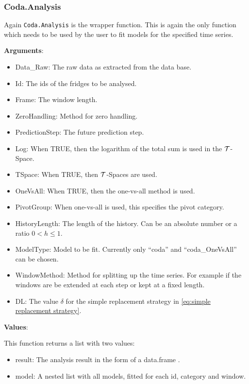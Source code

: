 \subsubsection{Coda.Analysis}
\label{sec:Coda.Analysis}

Again \texttt{Coda.Analysis} is the wrapper function. This is again the only function which needs to be used by the user to fit models for the specified time series.

\textbf{Arguments}:

\begin{itemize}
	\item Data\_Raw: The raw data as extracted from the data base.
	\item Id: The ids of the fridges to be analysed.
	\item Frame: The window length.
	\item ZeroHandling: Method for zero handling. 
	\item PredictionStep: The future prediction step. 
	\item Log: When TRUE, then the logarithm of the total sum is used in the $\mathcal{T}$-Space.
	\item TSpace: When TRUE, then $\mathcal{T}$-Spaces are used. 
	\item OneVsAll: When TRUE, then the one-vs-all method is used. 
	\item PivotGroup: When one-vs-all is used, this specifies the pivot category.
	\item HistoryLength: The length of the history. Can be an absolute number or a ratio $0<h\leq 1$. 
	\item ModelType: Model to be fit. Currently only "`coda"' and "`coda\_OneVsAll"' can be chosen.
	\item WindowMethod: Method for splitting up the time series. For example if the windows are be extended at each step or kept at a fixed length.
	\item DL: The value $\delta$ for the simple replacement strategy in \ref{eq:simple replacement strategy}. 
\end{itemize}

\textbf{Values}:

This function returns a list with two values:

\begin{itemize}
	\item result: The analysis result in the form of a data.frame . 
	\item model: A nested list with all models, fitted for each id, category and window.
\end{itemize}


